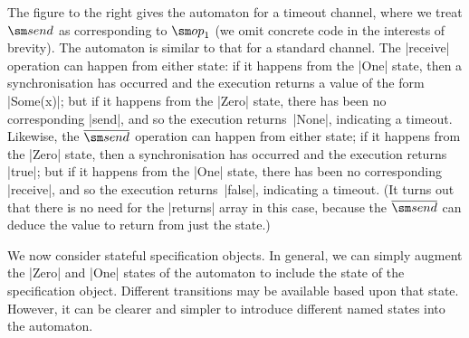 The figure to the right gives the automaton for a timeout channel, where we treat
$\send$ as corresponding to $\op_1$ (we omit concrete code in the interests of
brevity).  The automaton is similar to that for a
standard channel.  The |receive| operation can happen from either state: if it
happens from the |One| state, then a synchronisation has occurred and the
execution returns a value of the form |Some(x)|; but if it happens from the
|Zero| state, there has been no corresponding |send|, and so the execution
returns~|None|, indicating a timeout.  Likewise, the $\overline{\send}$
operation can happen from either state; if it happens from the |Zero| state,
then a synchronisation has occurred and the execution returns |true|; but if
it happens from the |One| state, there has been no corresponding |receive|,
and so the execution returns~|false|, indicating a timeout.  (It turns out that
there is no need for the |returns| array in this case, because the
$\overline{\send}$ can deduce the value to return from just the state.)
\end{window}




We now consider stateful specification objects.  In general, we can simply
augment the |Zero| and |One| states of the automaton to include the state of
the specification object.  Different transitions may be available
based upon that state.  However, it can be clearer and simpler to introduce
different named states into the automaton.

